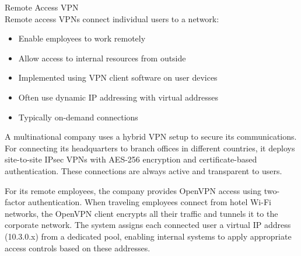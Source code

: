 \begin{concept}{Remote Access VPN}\\
Remote access VPNs connect individual users to a network:
\begin{itemize}
    \item Enable employees to work remotely
    \item Allow access to internal resources from outside
    \item Implemented using VPN client software on user devices
    \item Often use dynamic IP addressing with virtual addresses
    \item Typically on-demand connections
\end{itemize}
\end{concept}

\begin{example}
A multinational company uses a hybrid VPN setup to secure its communications. For connecting its headquarters to branch offices in different countries, it deploys site-to-site IPsec VPNs with AES-256 encryption and certificate-based authentication. These connections are always active and transparent to users.

For its remote employees, the company provides OpenVPN access using two-factor authentication. When traveling employees connect from hotel Wi-Fi networks, the OpenVPN client encrypts all their traffic and tunnels it to the corporate network. The system assigns each connected user a virtual IP address (10.3.0.x) from a dedicated pool, enabling internal systems to apply appropriate access controls based on these addresses.
\end{example}

